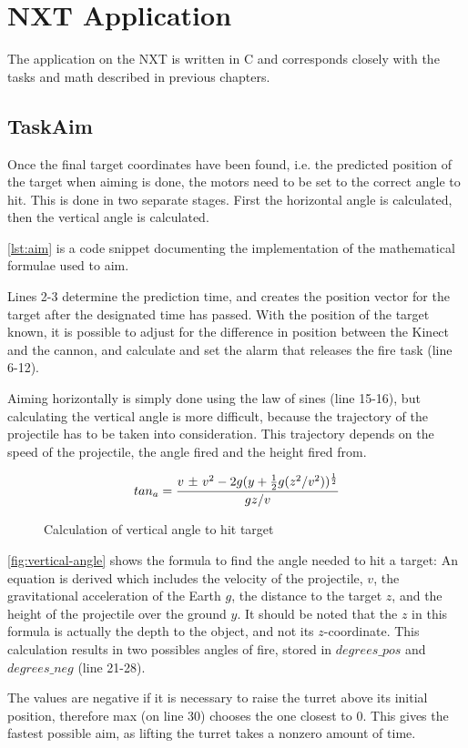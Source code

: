 \section{NXT Application}
The application on the NXT is written in C and corresponds closely with the tasks and math described in previous chapters.

\subsection{TaskAim}
Once the final target coordinates have been found, i.e. the predicted position of the target when aiming is done, the motors need to be set to the correct angle to hit. This is done in two separate stages. First the horizontal angle is calculated, then the vertical angle is calculated.

\autoref{lst:aim} is a code snippet documenting the implementation of the mathematical formulae used to aim.


Lines 2-3 determine the prediction time, and creates the position vector for the target after the designated
time has passed. With the position of the target known, it is possible to adjust for the difference in position 
between the Kinect and the cannon, and calculate and set the alarm that releases the fire task (line 6-12).

Aiming horizontally is simply done using the law of sines (line 15-16), but calculating the vertical angle is more difficult, because the trajectory of the projectile has to be taken into consideration. This trajectory depends on the speed of the projectile, the angle fired and the height fired from.

\begin{figure}[htbp]
$$tan_a = {v \text{ \textpm} \text{ } v^2 - 2g(y + {1 \over 2}g(z^2/v^2))^{1 \over 2} \over gz/v}$$
\caption{Calculation of vertical angle to hit target}
\label{fig:vertical-angle}
\end{figure}

\autoref{fig:vertical-angle} shows the formula to find the angle needed to hit a target: An equation is derived which  
includes the velocity of the projectile, $v$, the gravitational acceleration of the Earth $g$, the distance to the
target $z$, and the height of the projectile over the ground $y$. It should be noted that the $z$ in this formula
is actually the depth to the object, and not its $z$-coordinate. This calculation results in two possibles angles
of fire, stored in $degrees\_pos$ and $degrees\_neg$ (line 21-28).

The values are negative if it is necessary to raise the turret above its initial position, therefore max (on line 30)
chooses the one closest to 0\textdegree . This gives the fastest possible aim, as lifting the turret takes a nonzero
amount of time.
